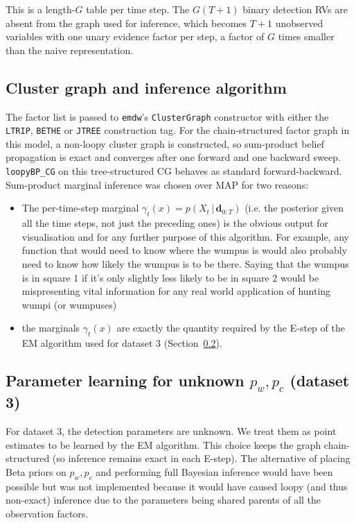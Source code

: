\documentclass[11pt, a4paper]{article}
\newcommand{\given}{\,\vert\,}
\newcommand{\bd}{\mathbf{d}}
\begin{document}
\noindent This is a length-$G$ table per time step.
The $G(T{+}1)$ binary detection RVs are absent from the graph used for
inference, which becomes $T{+}1$ unobserved variables with one unary
evidence factor per step, a factor of $G$ times smaller than the naive
representation. 

\subsection{Cluster graph and inference algorithm}

The factor list is passed to \texttt{emdw}'s \texttt{ClusterGraph}
constructor with either the \texttt{LTRIP}, \texttt{BETHE} or \texttt{JTREE} construction
tag. For the chain-structured factor graph in this model, a non-loopy
cluster graph is constructed, so sum-product belief propagation
is exact and converges after one forward and one backward sweep.
\texttt{loopyBP\_CG} on this tree-structured CG behaves as standard
forward-backward. \\[10pt]
Sum-product marginal inference was chosen over MAP for two
reasons:\\
\begin{itemize}
  \item The per-time-step marginal $\gamma_t(x) = p(X_t \given
\bd_{0:T})$ (i.e. the posterior given all the time steps, not just the preceding ones)
 is the obvious output for visualisation and for any further
purpose of this algorithm. For example, any function that would need to know
where the wumpus is would also probably need to know how likely
the wumpus is to be there. Saying that the wumpus is in square 1 if it's only slightly less likely to be in square 2
 would be mispresenting vital information for any real world application of hunting wumpi (or wumpuses)

  \item the marginals $\gamma_t(x)$ are exactly the quantity required by the E-step of the
EM algorithm used for dataset 3 (Section~\ref{sec:em}).
\end{itemize}


\subsection{Parameter learning for unknown $p_w, p_c$ (dataset 3)}
\label{sec:em}

For dataset 3, the detection parameters are unknown. We treat them as
point estimates to be learned by the EM algorithm.
This choice keeps the graph chain-structured (so inference remains exact in
each E-step). The alternative of placing Beta priors on $p_w, p_c$ and performing full
Bayesian inference would have been possible but was not implemented because it would
have caused loopy (and thus non-exact) inference due to the parameters being shared parents of all the observation factors.
\end{document}
